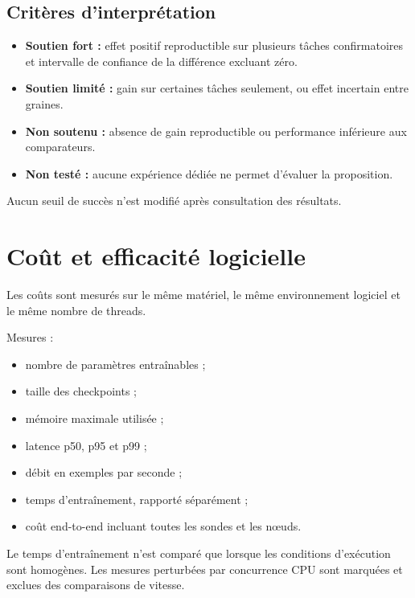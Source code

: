 \documentclass[11pt,a4paper]{article}
\begin{document}
\subsection{Critères d'interprétation}

\begin{itemize}
  \item \textbf{Soutien fort :} effet positif reproductible sur plusieurs
        tâches confirmatoires et intervalle de confiance de la
        différence excluant zéro.
  \item \textbf{Soutien limité :} gain sur certaines tâches seulement,
        ou effet incertain entre graines.
  \item \textbf{Non soutenu :} absence de gain reproductible ou
        performance inférieure aux comparateurs.
  \item \textbf{Non testé :} aucune expérience dédiée ne permet
        d'évaluer la proposition.
\end{itemize}

Aucun seuil de succès n'est modifié après consultation des résultats.

\section{Coût et efficacité logicielle}

Les coûts sont mesurés sur le même matériel, le même environnement
logiciel et le même nombre de threads.

Mesures :
\begin{itemize}
  \item nombre de paramètres entraînables ;
  \item taille des checkpoints ;
  \item mémoire maximale utilisée ;
  \item latence p50, p95 et p99 ;
  \item débit en exemples par seconde ;
  \item temps d'entraînement, rapporté séparément ;
  \item coût end-to-end incluant toutes les sondes et les nœuds.
\end{itemize}

Le temps d'entraînement n'est comparé que lorsque les conditions
d'exécution sont homogènes. Les mesures perturbées par concurrence
CPU sont marquées et exclues des comparaisons de vitesse.
\end{document}
